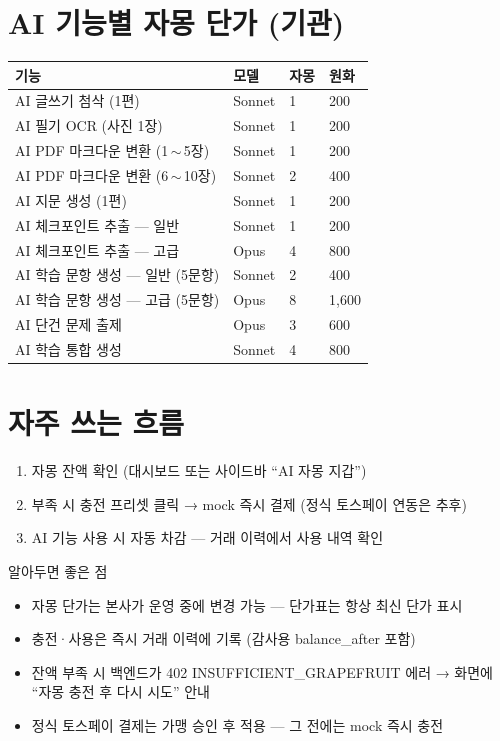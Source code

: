 \section*{AI 기능별 자몽 단가 (기관)}
\noindent
\begin{tabular}{@{}p{6cm}p{2cm}p{2cm}p{2cm}@{}}
\toprule
\textbf{기능} & \textbf{모델} & \textbf{자몽} & \textbf{원화} \\
\midrule
AI 글쓰기 첨삭 (1편) & Sonnet & 1 & 200 \\
AI 필기 OCR (사진 1장) & Sonnet & 1 & 200 \\
AI PDF 마크다운 변환 (1\,$\sim$\,5장) & Sonnet & 1 & 200 \\
AI PDF 마크다운 변환 (6\,$\sim$\,10장) & Sonnet & 2 & 400 \\
AI 지문 생성 (1편) & Sonnet & 1 & 200 \\
AI 체크포인트 추출 — 일반 & Sonnet & 1 & 200 \\
AI 체크포인트 추출 — 고급 & Opus & 4 & 800 \\
AI 학습 문항 생성 — 일반 (5문항) & Sonnet & 2 & 400 \\
AI 학습 문항 생성 — 고급 (5문항) & Opus & 8 & 1,600 \\
AI 단건 문제 출제 & Opus & 3 & 600 \\
AI 학습 통합 생성 & Sonnet & 4 & 800 \\
\bottomrule
\end{tabular}

\section*{자주 쓰는 흐름}
\begin{enumerate}
  \item 자몽 잔액 확인 (대시보드 또는 사이드바 ``AI 자몽 지갑'')
  \item 부족 시 충전 프리셋 클릭 → mock 즉시 결제 (정식 토스페이 연동은 추후)
  \item AI 기능 사용 시 자동 차감 — 거래 이력에서 사용 내역 확인
\end{enumerate}

\begin{tipbox}{알아두면 좋은 점}
\begin{itemize}[leftmargin=1.2em]
  \item 자몽 단가는 본사가 운영 중에 변경 가능 — 단가표는 항상 최신 단가 표시
  \item 충전·사용은 즉시 거래 이력에 기록 (감사용 balance\_after 포함)
  \item 잔액 부족 시 백엔드가 402 INSUFFICIENT\_GRAPEFRUIT 에러 → 화면에 ``자몽 충전 후 다시 시도'' 안내
  \item 정식 토스페이 결제는 가맹 승인 후 적용 — 그 전에는 mock 즉시 충전
\end{itemize}
\end{tipbox}
